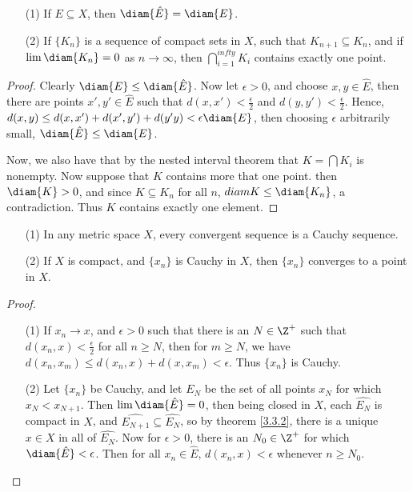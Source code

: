 \begin{theorem}\label{3.3.2}
  \begin{enumerate}
    \item[(1)] If $E \subseteq X$, then  $\diam{\hat{E}}=\diam{E}$.

    \item[(2)] If $\{K_n\}$ is a sequence of compact sets in  $X$, such that  $K_{n+1} \subseteq K_n$, and
      if  $\lim{\diam{K_n}}=0$ as  $n \rightarrow \infty$, then  $\bigcap_{i=1}^{infty}{K_i}$ contains
      exactly one point.
  \end{enumerate}
\end{theorem}
\begin{proof}
  Clearly $\diam{E} \leq \diam{\hat{E}}$. Now let  $\epsilon>0$, and choose  $x,y \in \hat{E}$, then
  there are points $x',y' \in \hat{E}$ such that  $d(x,x')<\frac{\epsilon}{2}$ and $d(y,y')<
  \frac{\epsilon}{2}$. Hence, $d(x,y) \leq d(x,x')+d(x',y')+d(y'y)<\epsilon \diam{E}$, then
  choosing  $\epsilon$ arbitrarily small,  $\diam{\hat{E}} \leq \diam{E}$.

  Now, we also have that by the nested interval theorem that $K=\bigcap{K_i}$ is nonempty. Now
  suppose that  $K$ contains more that one point. then $\diam{K}>0$, and since  $K \subseteq K_n$ for
  all  $n$,  $diam{K} \leq \diam{K_n}$, a contradiction. Thus  $K$ contains exactly one element.
\end{proof}

\begin{theorem}\label{3.3.3}
  \begin{enumerate}
    \item[(1)] In any metric space $X$, every convergent sequence is a Cauchy sequence.

    \item[(2)] If $X$ is compact, and  $\{x_n\}$ is Cauchy in  $X$, then $\{x_n\}$
      converges to a point in  $X$.
  \end{enumerate}
\end{theorem}
\begin{proof}
  \begin{enumerate}
    \item[(1)] If $x_n \rightarrow x$, and $\epsilon>0$ such that there is an  $N \in \Z^+$ such that
      $d(x_n,x)<\frac{\epsilon}{2}$ for all $n \geq N$, then for  $m \geq N$, we have
      $d(x_n,x_m) \leq d(x_n,x)+d(x,x_m)<\epsilon$. Thus  $\{x_n\}$ is Cauchy.

    \item[(2)] Let $\{x_n\}$ be Cauchy, and let  $E_N$ be the set of all points  $x_N$ for
      which  $x_N<x_{N+1}$. Then  $\lim{\diam{\hat{E}}}=0$, then being closed in  $X$, each
      $\hat{E_N}$ is compact in  $X$, and  $\hat{E_{N+1}} \subseteq \hat{E_N}$, so
      by theorem \ref{3.3.2}, there is a unique  $x \in X$ in all of $\hat{E_N}$. Now for
      $\epsilon>0$, there is an  $N_0 \in \Z^+$ for which $\diam{\hat{E}}<\epsilon$. Then for all
      $x_n \in \hat{E}$,  $d(x_n,x)<\epsilon$ whenever  $n \geq N_0$.
  \end{enumerate}
\end{proof}

